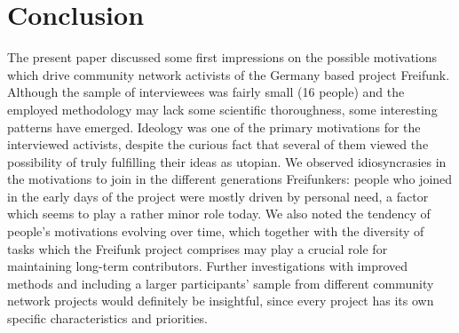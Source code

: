 \section{Conclusion}

The present paper discussed some first impressions on the possible motivations which drive community network activists of the Germany based project Freifunk.
Although the sample of interviewees was fairly small (16 people) and the employed methodology may lack some scientific thoroughness, some interesting patterns have emerged.
Ideology was one of the primary motivations for the interviewed activists, despite the curious fact that several of them viewed the possibility of truly fulfilling their ideas as utopian.
We observed idiosyncrasies in the motivations to join in the different generations Freifunkers:
people who joined in the early days of the project were mostly driven by personal need, a factor which seems to play a rather minor role today.
We also noted the tendency of people's motivations evolving over time,
which together with the diversity of tasks which the Freifunk project comprises may play a crucial role for maintaining long-term contributors.
Further investigations with improved methods and including a larger participants' sample from different community network projects would definitely be insightful, since every project has its own specific characteristics and priorities.


\begin{comment}
* an investigation of further community network projects would definitely be insightful, since all of them have sometimes quite different aspects, ideas, definitions, motivations

* not clear whether such a comparison is really valid: methods for gathering results in both domains vary widely

* Die Papers beschäftigen sich (vor allem) mit der Motivation von Entwickler*innen. Allerdings gibt es auch andere Möglichkeiten zu beiden Communities beizutragen (user documentation, publicity, design, Übersetzung, ...). Kann man sich da andere Motivationen vorstellen?

* critical discussion of the own methodology
\end{comment}
